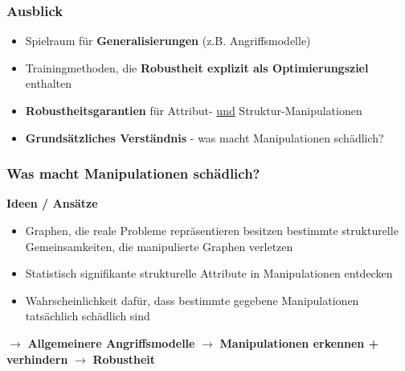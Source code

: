 \documentclass{beamer}
\begin{document}
\begin{frame}
  \frametitle{Ausblick}

  \begin{itemize}
    \item Spielraum für \textbf{Generalisierungen} (z.B. Angriffsmodelle)
    \item Trainingmethoden, die \textbf{Robustheit explizit als Optimierungsziel} enthalten
    \item \textbf{Robustheitsgarantien} für Attribut- \underline{und} Struktur-Manipulationen
    \item \textbf{Grundsätzliches Verständnis} - was macht Manipulationen schädlich?
  \end{itemize}
\end{frame}

\begin{frame}
  \frametitle{Was macht Manipulationen schädlich?}

  \textbf{Ideen / Ansätze}
  \begin{itemize}
    \item Graphen, die reale Probleme repräsentieren besitzen bestimmte strukturelle Gemeinsamkeiten, die manipulierte Graphen verletzen
    \item Statistisch signifikante strukturelle Attribute in Manipulationen entdecken
    \item Wahrscheinlichkeit dafür, dass bestimmte gegebene Manipulationen tatsächlich schädlich sind
  \end{itemize}

  $\rightarrow$ \textbf{Allgemeinere Angriffsmodelle}\newline
  $\rightarrow$ \textbf{Manipulationen erkennen + verhindern}\newline
  $\rightarrow$ \textbf{Robustheit}\newline

\end{frame}

\begin{frame}[allowframebreaks]
  
  
\end{frame}
\end{document}
